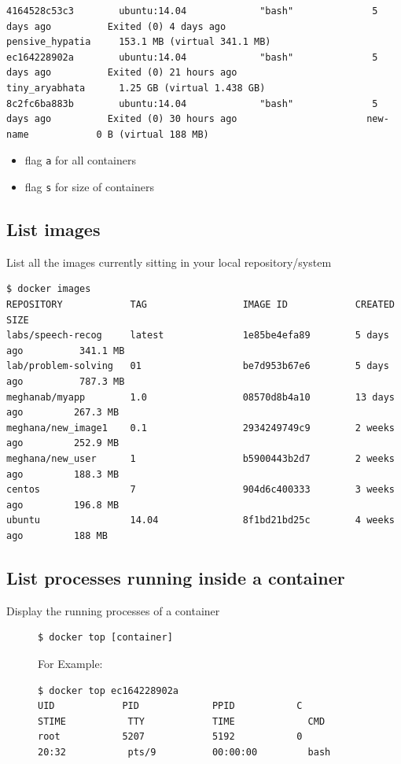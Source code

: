 \documentclass[11pt]{article}
\begin{document}
\begin{description}
\begin{verbatim}
4164528c53c3        ubuntu:14.04             "bash"              5 days ago          Exited (0) 4 days ago                         pensive_hypatia     153.1 MB (virtual 341.1 MB)
ec164228902a        ubuntu:14.04             "bash"              5 days ago          Exited (0) 21 hours ago                       tiny_aryabhata      1.25 GB (virtual 1.438 GB)
8c2fc6ba883b        ubuntu:14.04             "bash"              5 days ago          Exited (0) 30 hours ago                       new-name            0 B (virtual 188 MB)
\end{verbatim}
\begin{itemize}
\item flag \texttt{a} for all containers
\item flag \texttt{s} for size of containers
\end{itemize}
\end{description}

\subsection{List images}
\label{sec:orgheadline13}
List all the images currently sitting in your local repository/system
\begin{verbatim}
$ docker images
REPOSITORY            TAG                 IMAGE ID            CREATED             SIZE
labs/speech-recog     latest              1e85be4efa89        5 days ago          341.1 MB
lab/problem-solving   01                  be7d953b67e6        5 days ago          787.3 MB
meghanab/myapp        1.0                 08570d8b4a10        13 days ago         267.3 MB
meghana/new_image1    0.1                 2934249749c9        2 weeks ago         252.9 MB
meghana/new_user      1                   b5900443b2d7        2 weeks ago         188.3 MB
centos                7                   904d6c400333        3 weeks ago         196.8 MB
ubuntu                14.04               8f1bd21bd25c        4 weeks ago         188 MB
\end{verbatim}
\subsection{List processes running inside a container}
\label{sec:orgheadline14}
\begin{description}
\item[{Display the running processes of a container}] \begin{verbatim}
$ docker top [container]
\end{verbatim}
For Example:
\begin{verbatim}
$ docker top ec164228902a
UID            PID             PPID           C              STIME           TTY            TIME             CMD
root           5207            5192           0              20:32           pts/9          00:00:00         bash
\end{verbatim}
\end{description}
\end{document}
